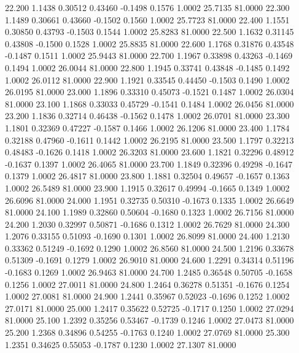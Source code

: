   22.200   1.1438   0.30512   0.43460  -0.1498   0.1576   1.0002  25.7135  81.0000
  22.300   1.1489   0.30661   0.43660  -0.1502   0.1560   1.0002  25.7723  81.0000
  22.400   1.1551   0.30850   0.43793  -0.1503   0.1544   1.0002  25.8283  81.0000
  22.500   1.1632   0.31145   0.43808  -0.1500   0.1528   1.0002  25.8835  81.0000
  22.600   1.1768   0.31876   0.43548  -0.1487   0.1511   1.0002  25.9443  81.0000
  22.700   1.1967   0.33898   0.43263  -0.1469   0.1494   1.0002  26.0044  81.0000
  22.800   1.1945   0.33741   0.43848  -0.1485   0.1492   1.0002  26.0112  81.0000
  22.900   1.1921   0.33545   0.44450  -0.1503   0.1490   1.0002  26.0195  81.0000
  23.000   1.1896   0.33310   0.45073  -0.1521   0.1487   1.0002  26.0304  81.0000
  23.100   1.1868   0.33033   0.45729  -0.1541   0.1484   1.0002  26.0456  81.0000
  23.200   1.1836   0.32714   0.46438  -0.1562   0.1478   1.0002  26.0701  81.0000
  23.300   1.1801   0.32369   0.47227  -0.1587   0.1466   1.0002  26.1206  81.0000
  23.400   1.1784   0.32188   0.47960  -0.1611   0.1442   1.0002  26.2195  81.0000
  23.500   1.1797   0.32213   0.48483  -0.1626   0.1418   1.0002  26.3203  81.0000
  23.600   1.1821   0.32296   0.48912  -0.1637   0.1397   1.0002  26.4065  81.0000
  23.700   1.1849   0.32396   0.49298  -0.1647   0.1379   1.0002  26.4817  81.0000
  23.800   1.1881   0.32504   0.49657  -0.1657   0.1363   1.0002  26.5489  81.0000
  23.900   1.1915   0.32617   0.49994  -0.1665   0.1349   1.0002  26.6096  81.0000
  24.000   1.1951   0.32735   0.50310  -0.1673   0.1335   1.0002  26.6649  81.0000
  24.100   1.1989   0.32860   0.50604  -0.1680   0.1323   1.0002  26.7156  81.0000
  24.200   1.2030   0.32997   0.50871  -0.1686   0.1312   1.0002  26.7629  81.0000
  24.300   1.2076   0.33155   0.51093  -0.1690   0.1301   1.0002  26.8099  81.0000
  24.400   1.2130   0.33362   0.51249  -0.1692   0.1290   1.0002  26.8560  81.0000
  24.500   1.2196   0.33678   0.51309  -0.1691   0.1279   1.0002  26.9010  81.0000
  24.600   1.2291   0.34314   0.51196  -0.1683   0.1269   1.0002  26.9463  81.0000
  24.700   1.2485   0.36548   0.50705  -0.1658   0.1256   1.0002  27.0011  81.0000
  24.800   1.2464   0.36278   0.51351  -0.1676   0.1254   1.0002  27.0081  81.0000
  24.900   1.2441   0.35967   0.52023  -0.1696   0.1252   1.0002  27.0171  81.0000
  25.000   1.2417   0.35622   0.52725  -0.1717   0.1250   1.0002  27.0294  81.0000
  25.100   1.2392   0.35256   0.53467  -0.1739   0.1246   1.0002  27.0473  81.0000
  25.200   1.2368   0.34896   0.54255  -0.1763   0.1240   1.0002  27.0769  81.0000
  25.300   1.2351   0.34625   0.55053  -0.1787   0.1230   1.0002  27.1307  81.0000
